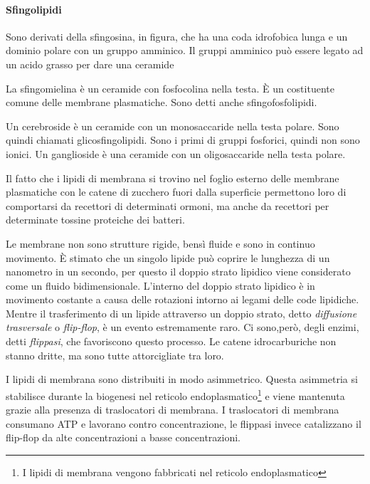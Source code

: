 \paragraph{Sfingolipidi}

Sono derivati della sfingosina, in figura, che ha una coda idrofobica lunga e un dominio polare con un gruppo amminico.
Il gruppi amminico può essere legato ad un acido grasso per dare una ceramide


La sfingomielina è un ceramide con fosfocolina nella testa. È un costituente comune delle membrane plasmatiche. Sono detti anche sfingofosfolipidi.



Un cerebroside è un ceramide con un monosaccaride nella testa polare. Sono quindi chiamati glicosfingolipidi. Sono i primi di gruppi fosforici, quindi non sono ionici.
Un ganglioside è una ceramide con un oligosaccaride nella testa polare.

Il fatto che i lipidi di membrana si trovino nel foglio esterno delle membrane plasmatiche con le catene di zucchero fuori dalla superficie permettono loro di comportarsi da recettori di determinati ormoni, ma anche da recettori per determinate tossine proteiche dei batteri.


Le membrane non sono strutture rigide, bensì fluide e sono in continuo movimento. È stimato che un singolo lipide può coprire le lunghezza di un nanometro in un secondo, per questo il doppio strato lipidico viene considerato come un fluido bidimensionale.
L'interno del doppio strato lipidico è in movimento costante a causa delle rotazioni intorno ai legami  delle code lipidiche. Mentre il trasferimento di un lipide attraverso un doppio strato, detto \emph{diffusione trasversale} o \emph{flip-flop}, è un evento estremamente raro.
Ci sono,però, degli enzimi, detti \emph{flippasi}, che favoriscono questo processo. Le catene idrocarburiche non stanno dritte, ma sono tutte attorcigliate tra loro.


I lipidi di membrana sono distribuiti in modo asimmetrico. Questa asimmetria si stabilisce durante la biogenesi nel reticolo endoplasmatico\footnote{I lipidi di membrana vengono fabbricati nel reticolo endoplasmatico} e viene mantenuta grazie alla presenza di traslocatori di membrana. I traslocatori di membrana consumano ATP e lavorano contro concentrazione, le flippasi invece catalizzano il flip-flop da alte concentrazioni a basse concentrazioni.


